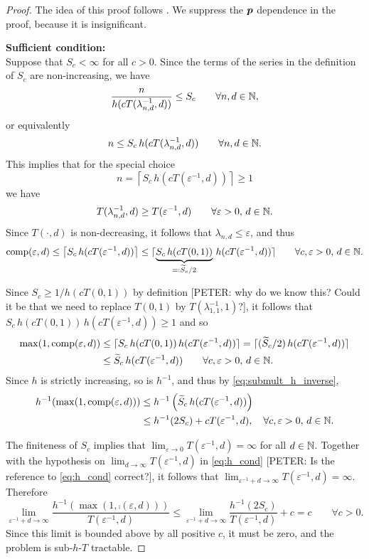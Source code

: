 \documentclass[sort&compress]{elsarticle}
\newcommand{\peter}[1]{\begingroup\color{violet}#1\endgroup}
\begin{document}
\begin{proof}
The idea of this proof follows \cite{WerWoz17a}.
We suppress the $\boldsymbol{p}$ dependence in the proof, because it is insignificant.

\bigskip

\noindent \textbf{Sufficient condition:}\\
Suppose that $S_c <\infty$ for all $c>0$.  Since the terms of the series in the definition of $S_c$ are non-increasing, we have
	\[
		\frac{n}{h(cT(\lambda_{n,d}^{-1},d))}\le S_c \qquad \forall n,d \in \mathbb{N},
	\]
or equivalently
\[
	n\le S_c \, h(cT(\lambda_{n,d}^{-1},d))   \qquad \forall n,d \in \mathbb{N}.
\]
This implies that for the special choice
\[
	n = \left\lceil
	S_c \, h(cT(\varepsilon^{-1},d))
	\right\rceil \ge 1
\]
	we have
	\[
	T(\lambda_{n,d}^{-1},d) \ge T(\varepsilon^{-1},d) \qquad \forall \varepsilon > 0, \, d \in \mathbb{N}.
	\]
Since $T(\cdot,d)$ is non-decreasing, it follows that $\lambda_{n,d} \le \varepsilon$, and thus
\[
\operatorname{comp}(\varepsilon,d) \le  \left\lceil
S_c \, h(cT(\varepsilon^{-1},d))
\right\rceil \le   \lceil \underbrace{
S_c \, h(cT(0,1))}_{=: \widetilde{S}_c/2} \, h(cT(\varepsilon^{-1},d))
\rceil\qquad \forall c, \varepsilon > 0, \, d \in \mathbb{N}.
\]

Since $S_c \ge 1/h(cT(0,1))$ by definition \peter{[PETER: why do we know this? Could it be that we need to replace $T(0,1)$ by $T(\lambda_{1,1}^{-1},1)$?]}, it follows that $S_c \, h(cT(0,1)) \, h(cT(\varepsilon^{-1},d))  \ge 1$ and so
\begin{align*}
\max(1,\operatorname{comp}(\varepsilon,d))
& \le  \lceil  S_c \, h(cT(0,1)) \, h(cT(\varepsilon^{-1},d))   \rceil
 =  \lceil
(\widetilde{S}_c/2) \, h(cT(\varepsilon^{-1},d))
\rceil \\
& \le   \widetilde{S}_c \, h(cT(\varepsilon^{-1},d))
\qquad\forall c, \varepsilon > 0, \, d \in \mathbb{N}.
\end{align*}
Since $h$ is strictly increasing, so is $h^{-1}$, and thus by \eqref{eq:submult_h_inverse}, 
\begin{align*}
h^{-1}(\max(1,\operatorname{comp}(\varepsilon,d)) ) & \le  h^{-1} \left(
\widetilde{S}_c \, h(cT(\varepsilon^{-1},d))  \right)
\\
&  \le  h^{-1} (2 S_c) + cT (\varepsilon^{-1},d),
\quad \forall c, \varepsilon > 0, \, d \in \mathbb{N}.
\end{align*}

The finiteness of $S_c$ implies that $\lim_{\varepsilon \to 0} T(\varepsilon^{-1},d) = \infty$ for all $d \in \mathbb{N}$.  Together with  the hypothesis on $\lim_{d \to \infty} T(\varepsilon^{-1},d)$ in \eqref{eq:h_cond}
\peter{[PETER: Is the reference to \eqref{eq:h_cond} correct?]}, it follows that $\lim_{\varepsilon^{-1} + d \to \infty} T(\varepsilon^{-1},d) = \infty$.  Therefore
\begin{equation*}
	\lim_{\varepsilon^{-1} + d \to \infty} \frac{h^{-1}(\max(1,\comp(\varepsilon,d)))}{T(\varepsilon^{-1},d)}
	\le \lim_{\varepsilon^{-1} + d \to \infty} \frac{h^{-1} (2 S_c)}{T(\varepsilon^{-1},d)}  + c = c \qquad\forall c >  0.
\end{equation*}
Since this limit is bounded above by all positive $c$, it must be zero, and the problem is sub-$h$-$T$ tractable.



\end{proof}
\end{document}
